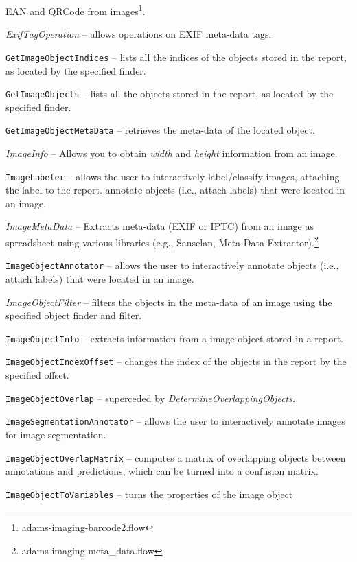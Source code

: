 \documentclass[a4paper]{book}
\begin{document}
\begin{tight_itemize}
  EAN and QRCode from images\footnote{adams-imaging-barcode2.flow}.
  \item \textit{ExifTagOperation} -- allows operations on EXIF meta-data tags.
  \item \texttt{GetImageObjectIndices} -- lists all the indices of the objects
  stored in the report, as located by the specified finder.
  \item \texttt{GetImageObjects} -- lists all the objects stored in the
  report, as located by the specified finder.
  \item \texttt{GetImageObjectMetaData} -- retrieves the meta-data of
  the located object.
  \item \textit{ImageInfo} -- Allows you to obtain \textit{width} and
  \textit{height} information from an image.
  \item \texttt{ImageLabeler} -- allows the user to interactively label/classify
  images, attaching the label to the report.
   annotate objects (i.e., attach labels) that were located in an image.
  \item \textit{ImageMetaData} -- Extracts meta-data (EXIF or IPTC) from an
  image as spreadsheet using various libraries (e.g., Sanselan\cite{sanselan},
  Meta-Data Extractor\cite{metadataextractor}).\footnote{adams-imaging-meta\_data.flow}
  \item \texttt{ImageObjectAnnotator} -- allows the user to interactively
   annotate objects (i.e., attach labels) that were located in an image.
  \item \textit{ImageObjectFilter} -- filters the objects in the meta-data of an image
  using the specified object finder and filter.
  \item \texttt{ImageObjectInfo} -- extracts information from a image object
  stored in a report.
  \item \texttt{ImageObjectIndexOffset} -- changes the index of the objects in the
  report by the specified offset.
  \item \texttt{ImageObjectOverlap} -- superceded by \textit{DetermineOverlappingObjects}.
  \item \texttt{ImageSegmentationAnnotator} -- allows the user to interactively
  annotate images for image segmentation.
  \item \texttt{ImageObjectOverlapMatrix} -- computes a matrix of overlapping objects between
  annotations and predictions, which can be turned into a confusion matrix.
  \item \texttt{ImageObjectToVariables} -- turns the properties of the image object

\end{tight_itemize}
\end{document}
